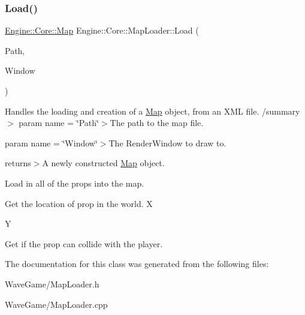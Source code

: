 \subsubsection{\texorpdfstring{Load()}{Load()}}
{\footnotesize\ttfamily \hyperlink{class_engine_1_1_core_1_1_map}{Engine\+::\+Core\+::\+Map} Engine\+::\+Core\+::\+Map\+Loader\+::\+Load (\begin{DoxyParamCaption}\item[{string}]{Path,  }\item[{Render\+Window $\ast$}]{Window }\end{DoxyParamCaption})\hspace{0.3cm}{\ttfamily [static]}}



Handles the loading and creation of a \hyperlink{class_engine_1_1_core_1_1_map}{Map} object, from an X\+ML file. /summary$>$ param name = \char`\"{}\+Path\char`\"{}$>$The path to the map file.

param name = \char`\"{}\+Window\char`\"{}$>$The Render\+Window to draw to.

returns$>$A newly constructed \hyperlink{class_engine_1_1_core_1_1_map}{Map} object.

Load in all of the props into the map.

Get the location of prop in the world. X

Y

Get if the prop can collide with the player. 

The documentation for this class was generated from the following files\+:\begin{DoxyCompactItemize}
\item 
Wave\+Game/Map\+Loader.\+h\item 
Wave\+Game/Map\+Loader.\+cpp\end{DoxyCompactItemize}
